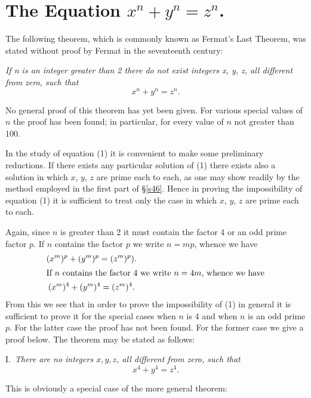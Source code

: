 \documentclass[oneside]{book}
\begin{document}
\section{The Equation $x^n + y^n = z^n$.}\label{s47}%

The following theorem, which is commonly known as Fermat's Last
Theorem, was stated without proof by Fermat in the seventeenth
century:

\smallskip\emph{If n is an integer greater than 2 there do not exist
integers x, y, z, all different from zero, such that}
\begin{equation}
x^n + y^n = z^n. \tag{1}
\end{equation}

No general proof of this theorem has yet been given. For various
special values of $n$ the proof has been found; in particular, for
every value of $n$ not greater than 100.

In the study of equation (1) it is convenient to make some
preliminary reductions. If there exists any particular solution of
(1) there exists also a solution in which $x$, $y$, $z$ are prime
each to each, as one may show readily by the method employed in the
first part of \S \ref{s46}. Hence in proving the impossibility of
equation (1) it is sufficient to treat only the case in which $x$,
$y$, $z$ are prime each to each.

Again, since $n$ is greater than 2 it must contain the factor
4 or an odd prime factor $p$. If $n$ contains the factor $p$ we write
$n = mp$, whence we have
\begin{gather*}
(x^m)^p + (y^m)^p = (z^m)^p). \\
\intertext{If $n$ contains the factor 4 we write $n = 4m$, whence we
have}
(x^m)^4 + (y^m)^4 = (z^m)^4.
\end{gather*}
From this we see that in order to prove the impossibility of (1) in
general it is sufficient to prove it for the special cases when $n$
is 4 and when $n$ is an odd prime $p$. For the latter case the proof
has not been found. For the former case we give a proof below. The
theorem may be stated as follows:

\smallskip I.~\emph{There are no integers $x, y, z$, all different
from zero, such that}
\begin{equation*}
x^4 + y^4 = z^4.
\end{equation*}

This is obviously a special case of the more general theorem:
\end{document}
